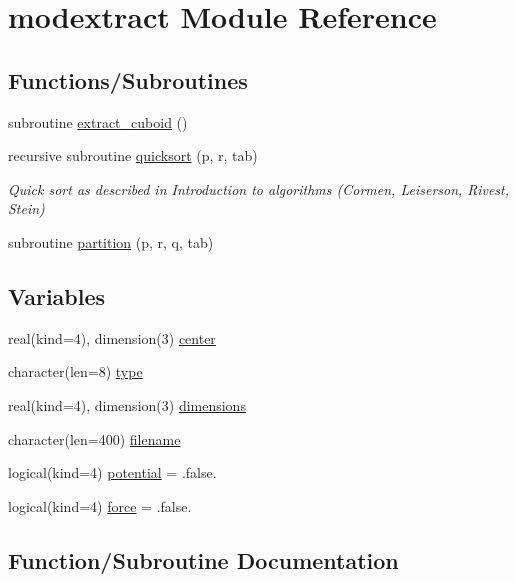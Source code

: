 \hypertarget{namespacemodextract}{}\section{modextract Module Reference}
\label{namespacemodextract}
\subsection*{Functions/\+Subroutines}
\begin{DoxyCompactItemize}
\item 
subroutine \hyperlink{namespacemodextract_ab52bfa146aa7f8575cb591e9920e9ff8}{extract\+\_\+cuboid} ()
\item 
recursive subroutine \hyperlink{namespacemodextract_ae2727d931e75af1a5b9d77819493e6d0}{quicksort} (p, r, tab)
\begin{DoxyCompactList}\small\item\em Quick sort as described in Introduction to algorithms (Cormen, Leiserson, Rivest, Stein) \end{DoxyCompactList}\item 
subroutine \hyperlink{namespacemodextract_ab98682bafefede4abc0ad57bd1288abf}{partition} (p, r, q, tab)
\end{DoxyCompactItemize}
\subsection*{Variables}
\begin{DoxyCompactItemize}
\item 
real(kind=4), dimension(3) \hyperlink{namespacemodextract_a58cf95edf95f11f9e6d8f589d4d93c8a}{center}
\item 
character(len=8) \hyperlink{namespacemodextract_af65545877ed74e44b340c563fb91e81c}{type}
\item 
real(kind=4), dimension(3) \hyperlink{namespacemodextract_ab5bee6c90bf98302903d0eee1434ea93}{dimensions}
\item 
character(len=400) \hyperlink{namespacemodextract_ab30082cee9f7c8893bad2fc07cd9a65c}{filename}
\item 
logical(kind=4) \hyperlink{namespacemodextract_a0bd93be7d411f7058ed49057de38d60f}{potential} = .false.
\item 
logical(kind=4) \hyperlink{namespacemodextract_a7b759ca92c494942296f343b61e4b2eb}{force} = .false.
\end{DoxyCompactItemize}


\subsection{Function/\+Subroutine Documentation}
